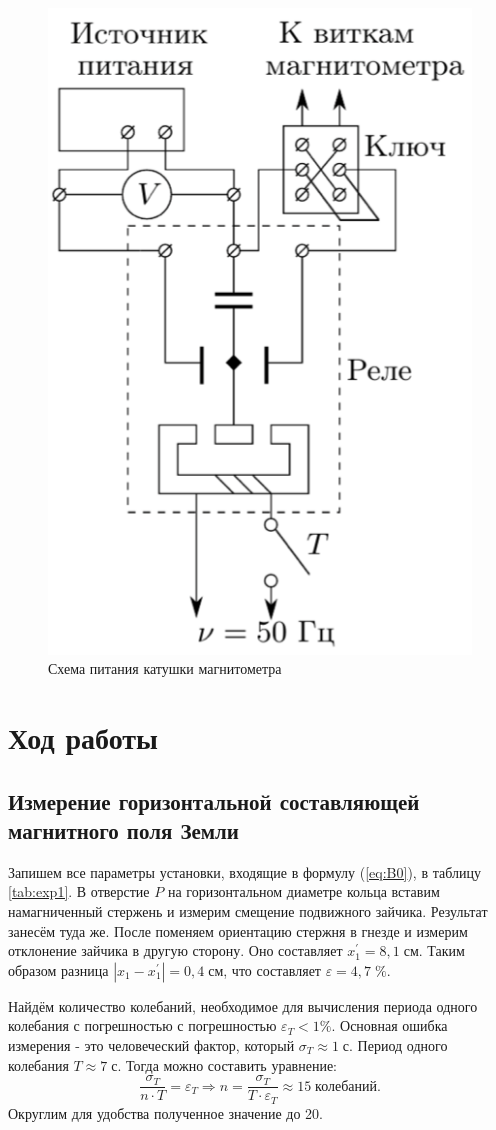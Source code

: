 \documentclass[a4paper,12pt]{article} %
\begin{document}
\begin{figure}[H]
	\centering
	\includegraphics[width = 8 cm]{res/coil.png}
	\caption{Схема питания катушки магнитометра}
	\label{fig:coil}
\end{figure}

\section*{Ход работы}

\subsection*{Измерение горизонтальной составляющей магнитного поля Земли}

Запишем все параметры установки, входящие в формулу (\ref{eq:B0}), в таблицу \ref{tab:exp1}. В отверстие $P$ на горизонтальном диаметре кольца вставим
намагниченный стержень и измерим смещение подвижного зайчика. Результат занесём туда же. После поменяем ориентацию стержня в гнезде и измерим отклонение зайчика в другую сторону. Оно составляет $x^\prime_1=8,1 \; \text{см}$. Таким образом разница $|x_1-x^\prime_1|=0,4 \; \text{см}$, что составляет $\varepsilon=4,7\; \%$.

Найдём количество колебаний, необходимое для вычисления периода одного колебания с погрешностью с погрешностью $\varepsilon_T<1\%$. Основная ошибка измерения - это человеческий фактор, который $\sigma_T \approx 1 \; \text{с}$. Период одного колебания $T \approx 7 \; \text{с}$. Тогда можно составить уравнение:
$$\frac{\sigma_T}{n \cdot T} = \varepsilon_T \Rightarrow n = \frac{\sigma_T}{T\cdot \varepsilon_T} \approx 15 \; \text{колебаний.}$$
Округлим для удобства полученное значение до 20.
\end{document}
